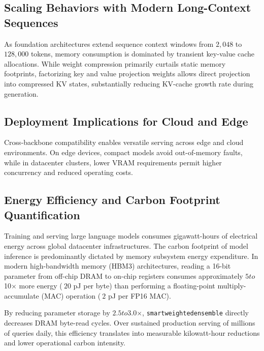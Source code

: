\subsection{Scaling Behaviors with Modern Long-Context Sequences}
As foundation architectures extend sequence context windows from $2{,}048$ to $128{,}000$ tokens, memory consumption is dominated by transient key-value cache allocations. While weight compression primarily curtails static memory footprints, factorizing key and value projection weights allows direct projection into compressed KV states, substantially reducing KV-cache growth rate during generation.

\subsection{Deployment Implications for Cloud and Edge}
Cross-backbone compatibility enables versatile serving across edge and cloud environments. On edge devices, compact models avoid out-of-memory faults, while in datacenter clusters, lower VRAM requirements permit higher concurrency and reduced operating costs.

\subsection{Energy Efficiency and Carbon Footprint Quantification}
Training and serving large language models consumes gigawatt-hours of electrical energy across global datacenter infrastructures. The carbon footprint of model inference is predominantly dictated by memory subsystem energy expenditure. In modern high-bandwidth memory (HBM3) architectures, reading a 16-bit parameter from off-chip DRAM to on-chip registers consumes approximately $5$\times$ to $10$\times$ more energy ($~20$ pJ per byte) than performing a floating-point multiply-accumulate (MAC) operation ($~2$ pJ per FP16 MAC).

By reducing parameter storage by $2.5$\times$ to $3.0$\times$, \texttt{smartweightedensemble} directly decreases DRAM byte-read cycles. Over sustained production serving of millions of queries daily, this efficiency translates into measurable kilowatt-hour reductions and lower operational carbon intensity.
